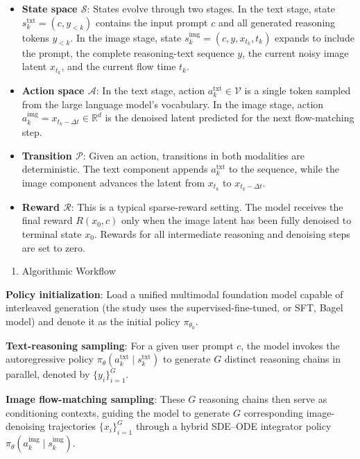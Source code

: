 \begin{itemize}
\tightlist
\item
  \textbf{State space \(\mathcal{S}\)}: States evolve through two stages. In the text stage, state \(s_k^{\mathrm{txt}}=(c,y_{\lt k})\) contains the input prompt \(c\) and all generated reasoning tokens \(y_{\lt k}\). In the image stage, state \(s_k^{\mathrm{img}}=(c,y,x_{t_k},t_k)\) expands to include the prompt, the complete reasoning-text sequence \(y\), the current noisy image latent \(x_{t_k}\), and the current flow time \(t_k\).
\item
  \textbf{Action space \(\mathcal{A}\)}: In the text stage, action \(a_k^{\mathrm{txt}}\in\mathcal{V}\) is a single token sampled from the large language model's vocabulary. In the image stage, action \(a_k^{\mathrm{img}}=x_{t_k-\Delta t}\in\mathbb{R}^d\) is the denoised latent predicted for the next flow-matching step.
\item
  \textbf{Transition \(\mathcal{P}\)}: Given an action, transitions in both modalities are deterministic. The text component appends \(a_k^{\mathrm{txt}}\) to the sequence, while the image component advances the latent from \(x_{t_k}\) to \(x_{t_k-\Delta t}\).
\item
  \textbf{Reward \(\mathcal{R}\)}: This is a typical sparse-reward setting. The model receives the final reward \(R(x_0,c)\) only when the image latent has been fully denoised to terminal state \(x_0\). Rewards for all intermediate reasoning and denoising steps are set to zero.
\end{itemize}

\begin{enumerate}
\def\labelenumi{\arabic{enumi}.}
\setcounter{enumi}{1}
\tightlist
\item
  Algorithmic Workflow
\end{enumerate}

\textbf{Policy initialization}: Load a unified multimodal foundation model capable of interleaved generation (the study uses the supervised-fine-tuned, or SFT, Bagel model) and denote it as the initial policy \(\pi_{\theta_0}\).

\textbf{Text-reasoning sampling}: For a given user prompt \(c\), the model invokes the autoregressive policy \(\pi_{\theta}(a_k^{\mathrm{txt}}\mid s_k^{\mathrm{txt}})\) to generate \(G\) distinct reasoning chains in parallel, denoted by \(\{y_i\}_{i=1}^{G}\).

\textbf{Image flow-matching sampling}: These \(G\) reasoning chains then serve as conditioning contexts, guiding the model to generate \(G\) corresponding image-denoising trajectories \(\{x_i\}_{i=1}^{G}\) through a hybrid SDE--ODE integrator policy \(\pi_{\theta}(a_k^{\mathrm{img}}\mid s_k^{\mathrm{img}})\).

